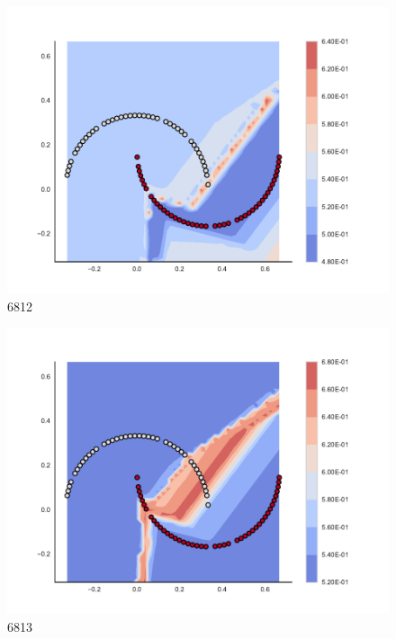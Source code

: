 \begin{subfigure}[b]{0.09\textwidth}
    \includegraphics[clip, trim=2.35cm 1.75cm 4.5cm 0cm,width=\textwidth]{img/convergence/6812.pdf}
    \caption{6812}
    \label{fig:convergence_6812}
\end{subfigure}
%
\begin{subfigure}[b]{0.09\textwidth}
    \includegraphics[clip, trim=2.35cm 1.75cm 4.5cm 0cm,width=\textwidth]{img/convergence/6813.pdf}
    \caption{6813}
    \label{fig:convergence_6813}
\end{subfigure}
%
